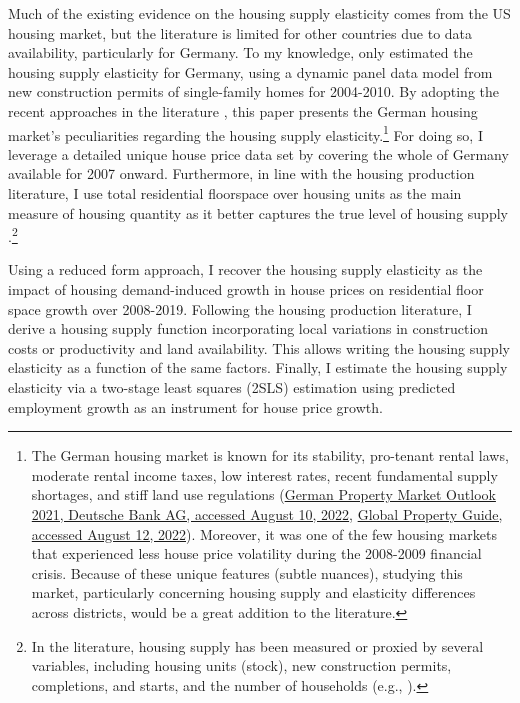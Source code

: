 \documentclass[
  12pt,
]{article}
\begin{document}
Much of the existing evidence on the housing supply elasticity comes from the US housing market, but the literature is limited for other countries due to data availability, particularly for Germany. To my knowledge, only \citet{lerbs2014} estimated the housing supply elasticity for Germany, using a dynamic panel data model from new construction permits of single-family homes for 2004-2010. By adopting the recent approaches in the literature \citep{saiz2010, hilber-vermeulen2016, baumsnow-han2019}, this paper presents the German housing market's peculiarities regarding the housing supply elasticity.\footnote{The German housing market is known for its stability, pro-tenant rental laws, moderate rental income taxes, low interest rates, recent fundamental supply shortages, and stiff land use regulations (\href{https://www.dbresearch.com/PROD/RPS_EN-PROD/PROD0000000000517463/Outlook_for_the_German_residential_property_market.pdf?undefined&realload=OGCzKhorommVYqr3DKzCKCT/4~0T75BVVmGs5XHbQs3QdBI~xyjvWG3i2CAeU6MJ}{German Property Market Outlook 2021, Deutsche Bank AG, accessed August 10, 2022}, \href{https://www.globalpropertyguide.com/Europe/Germany}{Global Property Guide, accessed August 12, 2022}). Moreover, it was one of the few housing markets that experienced less house price volatility during the 2008-2009 financial crisis. Because of these unique features (subtle nuances), studying this market, particularly concerning housing supply and elasticity differences across districts, would be a great addition to the literature.} For doing so, I leverage a detailed unique house price data set by \citet{rwi2020} covering the whole of Germany available for 2007 onward. Furthermore, in line with the housing production literature, I use total residential floorspace over housing units as the main measure of housing quantity as it better captures the true level of housing supply \citep{baumsnow-han2019, epple-etal2010}.\footnote{In the literature, housing supply has been measured or proxied by several variables, including housing units (stock), new construction permits, completions, and starts, and the number of households (e.g., \citet{saiz2010}).}

Using a reduced form approach, I recover the housing supply elasticity as the impact of housing demand-induced growth in house prices on residential floor space growth over 2008-2019. Following the housing production literature, I derive a housing supply function incorporating local variations in construction costs or productivity and land availability. This allows writing the housing supply elasticity as a function of the same factors. Finally, I estimate the housing supply elasticity via a two-stage least squares (2SLS) estimation using predicted employment growth as an instrument for house price growth.
\end{document}
